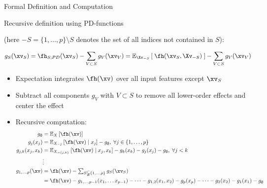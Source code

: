 \documentclass[11pt,compress,t,notes=noshow, aspectratio=169, xcolor=table]{beamer}
\newcommand{\open}{}
\newcommand{\close}{}
\begin{document}
\begin{frame}{Formal Definition and Computation
}

Recursive definition using PD-functions

(here $-S = \{1, \ldots, p \} \setminus S$ denotes the set of all indices not contained in \(S\)):

$$
g_{S}(\xv_S)
= \fh_{S;PD}(\xv_S) - \sum_{V \subset S} g_V(\xv_V)
= \mathbb{E}_{\Xv_{-S}} \left[ \; \fh(\xv_S, \Xv_{-S}) \; \right] - \sum_{V \subset S} g_V(\xv_V)
$$

\begin{itemize}
    \item Expectation integrates $\fh(\xv)$ over all input features except $\xv_S$
    \item Subtract all components $g_V$ with $V \subset S$ to remove all lower-order effects and center the effect
\pause
\item Recursive computation:
\begin{align*}
 g_{\open \emptyset \close} &= \mathbb{E}_X\left[\fh(\xv)\right] \\
 g_{\open j \close}(x_j) &= \mathbb{E}_{X_{-j}}\left[\fh(\xv) \; \vert  \; x_j \right] - g_{\open \emptyset \close}, \; \forall j \in \{1, \ldots, p\} \\%
 g_{\open j, k \close}(x_j, x_k)
 &= \mathbb{E}_{X_{-\{ j,k \}}}\left[\fh(\xv) \; \vert \; x_j, x_k \right] - g_{\open k \close}(x_k) - g_{\open j \close}(x_j) - g_{\open \emptyset \close}, \; \forall j < k\\%
 &\vdots \\
 g_{\open 1, \dots, p \close}(\xv)
 &= \fh(\xv) -
 \textstyle\sum_{S \subsetneqq \{1,\ldots,p\}} g_{S}(\xv_S) \\
 &= \fh(\xv) -
 g_{\open 1, \dots, p-1 \close}(x_{1}, \dots x_{p-1}) - \dots - g_{\open 1, 2 \close}(x_1, x_2)
 - g_{\open p \close}(x_p)  - \dots - g_{\open 2 \close}(x_2) - g_{\open 1 \close}(x_1) - g_{\open \emptyset \close}
\end{align*}

\end{itemize}
        
\end{frame}
\end{document}
